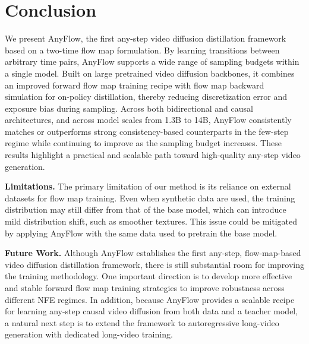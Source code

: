 \documentclass{llmxive}
\providecommand{\myPara}[1]{\noindent\textbf{#1}}
\begin{document}
\section{Conclusion}
We present AnyFlow, the first any-step video diffusion distillation framework based on a two-time flow map formulation. By learning transitions between arbitrary time pairs, AnyFlow supports a wide range of sampling budgets within a single model. Built on large pretrained video diffusion backbones, it combines an improved forward flow map training recipe with flow map backward simulation for on-policy distillation, thereby reducing discretization error and exposure bias during sampling. Across both bidirectional and causal architectures, and across model scales from 1.3B to 14B, AnyFlow consistently matches or outperforms strong consistency-based counterparts in the few-step regime while continuing to improve as the sampling budget increases. These results highlight a practical and scalable path toward high-quality any-step video generation.

\myPara{Limitations.} The primary limitation of our method is its reliance on external datasets for flow map training. Even when synthetic data are used, the training distribution may still differ from that of the base model, which can introduce mild distribution shift, such as smoother textures. This issue could be mitigated by applying AnyFlow with the same data used to pretrain the base model.

\myPara{Future Work.} Although AnyFlow establishes the first any-step, flow-map-based video diffusion distillation framework, there is still substantial room for improving the training methodology. One important direction is to develop more effective and stable forward flow map training strategies to improve robustness across different NFE regimes. In addition, because AnyFlow provides a scalable recipe for learning any-step causal video diffusion from both data and a teacher model, a natural next step is to extend the framework to autoregressive long-video generation with dedicated long-video training.


{
  \small
  
  
}
\end{document}
